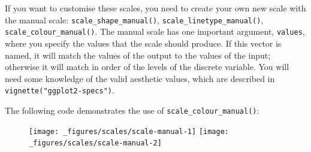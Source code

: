 If you want to customise these scales, you need to create your own new
scale with the manual scale: \texttt{scale\_shape\_manual()},
\texttt{scale\_linetype\_manual()}, \texttt{scale\_colour\_manual()}.
The manual scale has one important argument, \texttt{values}, where you
specify the values that the scale should produce. If this vector is
named, it will match the values of the output to the values of the
input; otherwise it will match in order of the levels of the discrete
variable. You will need some knowledge of the valid aesthetic values,
which are described in \texttt{vignette("ggplot2-specs")}.

The following code demonstrates the use of
\texttt{scale\_colour\_manual()}:

\begin{Shaded}
\begin{Highlighting}[]
\StringTok{ }\StringTok{ }
\StringTok{  }\NormalTok{() +}\StringTok{ }
\StringTok{  }\NormalTok{()}
\StringTok{ }
\StringTok{  }\NormalTok{(}\NormalTok{(} \StringTok{ }
\StringTok{  }\NormalTok{(}
     \NormalTok{(}\NormalTok{, }\NormalTok{, }\NormalTok{, }\NormalTok{), }
     
  \NormalTok{)}

\StringTok{ }\NormalTok{(}
   \NormalTok{, }
   \NormalTok{, }
   \NormalTok{, }
   
\NormalTok{)}
\StringTok{ }
\StringTok{  }\NormalTok{(}\NormalTok{(} \StringTok{ }
\StringTok{  }\NormalTok{(} 
\end{Highlighting}
\end{Shaded}

\begin{figure}[H]
  \texttt{[image: \_figures/scales/scale-manual-1]}%
  \texttt{[image: \_figures/scales/scale-manual-2]}
\end{figure}

